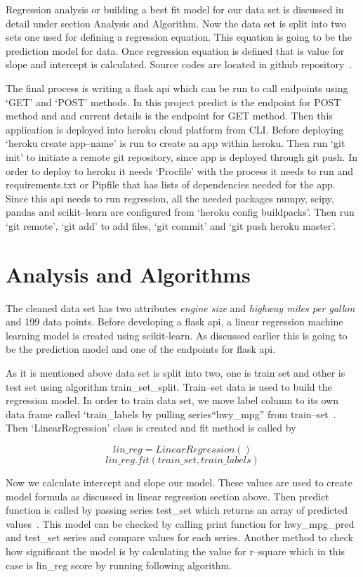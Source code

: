 Regression analysis or building a best fit model for our data set is
discussed in detail under section Analysis and Algorithm. Now the data
set is split into two sets one used for defining a regression
equation. This equation is going to be the prediction model for data.
Once regression equation is defined that is value for slope and
intercept is calculated.  Source codes are located in github
repository~\cite{hid-sp18-415-regression}.
   
The final process is writing a flask api which can be run to call
endpoints using `GET' and `POST' methods. In this project predict is
the endpoint for POST method and and current details is the endpoint
for GET method. Then this application is deployed into heroku cloud
platform from CLI. Before deploying `heroku create app--name' is run
to create an app within heroku. Then run `git init' to initiate a
remote git repository, since app is deployed through git push. In
order to deploy to heroku it needs `Procfile' with the process it
needs to run and requirements.txt or Pipfile that has lists of
dependencies needed for the app. Since this api needs to run
regression, all the needed packages numpy, scipy, pandas and
scikit--learn are configured from `heroku config buildpacks'. Then run
`git remote', `git add' to add files, `git commit' and `git push
heroku master'.
    

\section{Analysis and Algorithms}

The cleaned data set has two attributes \textit{engine size} and
\textit{highway miles per gallon} and 199 data points. Before
developing a flask api, a linear regression machine learning model is
created using scikit-learn. As discussed earlier this is going to be
the prediction model and one of the endpoints for flask api.

As it is mentioned above data set is split into two, one is train set
and other is test set using algorithm train\_set\_split.  Train--set
data is used to build the regression model. In order to train data
set, we move label column to its own data frame called `train\_labels
by pulling series``hwy\_mpg'' from
train--set~\cite{hid-sp18-415-regression}. Then `LinearRegression'
class is created and fit method is called by

\[lin\_reg = LinearRegression()\]
\[lin\_reg.fit(train\_set, train\_labels)\]

Now we calculate intercept and slope our model. These values are used
to create model formula as discussed in linear regression section
above. Then predict function is called by passing series test\_set
which returns an array of predicted
values~\cite{hid-sp18-415-regression}. This model can be checked by
calling print function for hwy\_mpg\_pred and test\_set series and
compare values for each series. Another method to check how
significant the model is by calculating the value for r--square which
in this case is lin\_reg score by running following algorithm.

